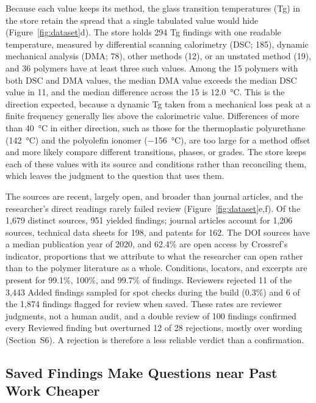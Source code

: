 \documentclass[journal=mamobx,manuscript=article]{achemso}
\begin{document}
Because each value keeps its method, the glass transition temperatures (Tg) in the store retain the spread that a single tabulated value would hide (Figure~\ref{fig:dataset}d).
The store holds 294 Tg findings with one readable temperature, measured by differential scanning calorimetry (DSC; 185), dynamic mechanical analysis (DMA; 78), other methods (12), or an unstated method (19), and 36 polymers have at least three such values.
Among the 15 polymers with both DSC and DMA values, the median DMA value exceeds the median DSC value in 11, and the median difference across the 15 is \SI{12.0}{\celsius}.
This is the direction expected, because a dynamic Tg taken from a mechanical loss peak at a finite frequency generally lies above the calorimetric value.\cite{Hutchinson2009Glass,GraciaFernandez2010Comparative}
Differences of more than \SI{40}{\celsius} in either direction, such as those for the thermoplastic polyurethane (\SI{+142}{\celsius}) and the polyolefin ionomer (\SI{-156}{\celsius}), are too large for a method offset and more likely compare different transitions, phases, or grades.
The store keeps each of these values with its source and conditions rather than reconciling them, which leaves the judgment to the question that uses them.

The sources are recent, largely open, and broader than journal articles, and the researcher's direct readings rarely failed review (Figure~\ref{fig:dataset}e,f).
Of the 1,679 distinct sources, 951 yielded findings; journal articles account for 1,206 sources, technical data sheets for 198, and patents for 162.
The DOI sources have a median publication year of 2020, and 62.4\% are open access by Crossref's indicator, proportions that we attribute to what the researcher can open rather than to the polymer literature as a whole.
Conditions, locators, and excerpts are present for 99.1\%, 100\%, and 99.7\% of findings.
Reviewers rejected 11 of the 3,443 Added findings sampled for spot checks during the build (0.3\%) and 6 of the 1,874 findings flagged for review when saved.
These rates are reviewer judgments, not a human audit, and a double review of 100 findings confirmed every Reviewed finding but overturned 12 of 28 rejections, mostly over wording (Section~S6).
A rejection is therefore a less reliable verdict than a confirmation.

\subsection{Saved Findings Make Questions near Past Work Cheaper}
\label{sec:memory}
\end{document}
